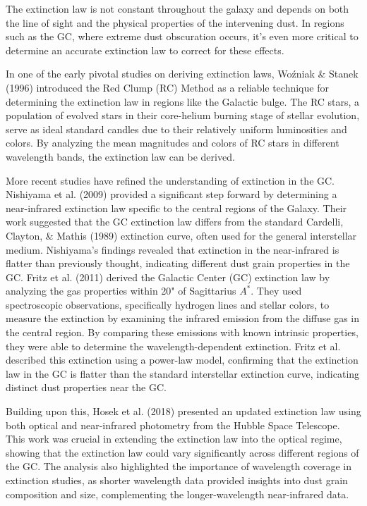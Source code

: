 \documentclass[twocolumn]{aastex631}
\begin{document}
The extinction law is not constant throughout the galaxy and depends on both the line of sight and the physical properties of the intervening dust. In regions such as the GC, where extreme dust obscuration occurs, it's even more critical to determine an accurate extinction law to correct for these effects.

In one of the early pivotal studies on deriving extinction laws, Woźniak \& Stanek (1996) introduced the Red Clump (RC) Method as a reliable technique for determining the extinction law in regions like the Galactic bulge. The RC stars, a population of evolved stars in their core-helium burning stage of stellar evolution, serve as ideal standard candles due to their relatively uniform luminosities and colors. By analyzing the mean magnitudes and colors of RC stars in different wavelength bands, the extinction law can be derived.


More recent studies have refined the understanding of extinction in the GC. Nishiyama et al. (2009) provided a significant step forward by determining a near-infrared extinction law specific to the central regions of the Galaxy. Their work suggested that the GC extinction law differs from the standard Cardelli, Clayton, \& Mathis (1989) extinction curve, often used for the general interstellar medium. Nishiyama’s findings revealed that extinction in the near-infrared is flatter than previously thought, indicating different dust grain properties in the GC. Fritz et al. (2011) derived the Galactic Center (GC) extinction law by analyzing the gas properties within 20" of Sagittarius $A^*$. They used spectroscopic observations, specifically hydrogen lines and stellar colors, to measure the extinction by examining the infrared emission from the diffuse gas in the central region. By comparing these emissions with known intrinsic properties, they were able to determine the wavelength-dependent extinction. Fritz et al. described this extinction using a power-law model, confirming that the extinction law in the GC is flatter than the standard interstellar extinction curve, indicating distinct dust properties near the GC.

Building upon this, Hosek et al. (2018) presented an updated extinction law using both optical and near-infrared photometry from the Hubble Space Telescope. This work was crucial in extending the extinction law into the optical regime, showing that the extinction law could vary significantly across different regions of the GC. The analysis also highlighted the importance of wavelength coverage in extinction studies, as shorter wavelength data provided insights into dust grain composition and size, complementing the longer-wavelength near-infrared data.
\end{document}
